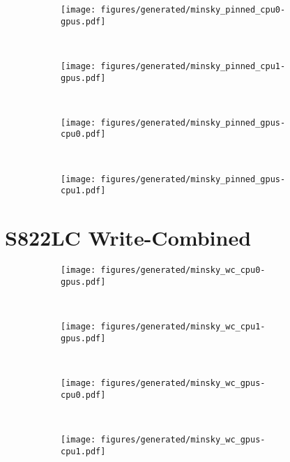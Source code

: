 \begin{figure}[H]
    \centering
    \begin{subfigure}[b]{0.45\textwidth}
        \texttt{[image: figures/generated/minsky\_pinned\_cpu0-gpus.pdf]}
        \caption{}
        \label{}
    \end{subfigure}
    ~
    \begin{subfigure}[b]{0.45\textwidth}
        \texttt{[image: figures/generated/minsky\_pinned\_cpu1-gpus.pdf]}
        \caption{}
        \label{}
    \end{subfigure}
    \\
    \begin{subfigure}[b]{0.45\textwidth}
        \texttt{[image: figures/generated/minsky\_pinned\_gpus-cpu0.pdf]}
        \caption{}
        \label{}
    \end{subfigure}
    ~
    \begin{subfigure}[b]{0.45\textwidth}
        \texttt{[image: figures/generated/minsky\_pinned\_gpus-cpu1.pdf]}
        \caption{}
        \label{}
    \end{subfigure}
    \caption[]{}
    \label{fig:data-minsky-pinned}
\end{figure}

\section{S822LC Write-Combined}

\begin{figure}[H]
    \centering
    \begin{subfigure}[b]{0.45\textwidth}
        \texttt{[image: figures/generated/minsky\_wc\_cpu0-gpus.pdf]}
        \caption{}
        \label{}
    \end{subfigure}
    ~
    \begin{subfigure}[b]{0.45\textwidth}
        \texttt{[image: figures/generated/minsky\_wc\_cpu1-gpus.pdf]}
        \caption{}
        \label{}
    \end{subfigure}
    \\
    \begin{subfigure}[b]{0.45\textwidth}
        \texttt{[image: figures/generated/minsky\_wc\_gpus-cpu0.pdf]}
        \caption{}
        \label{}
    \end{subfigure}
    ~
    \begin{subfigure}[b]{0.45\textwidth}
        \texttt{[image: figures/generated/minsky\_wc\_gpus-cpu1.pdf]}
        \caption{}
        \label{}
    \end{subfigure}
    \caption[]{}
    \label{fig:data-minsky-wc}
\end{figure}

